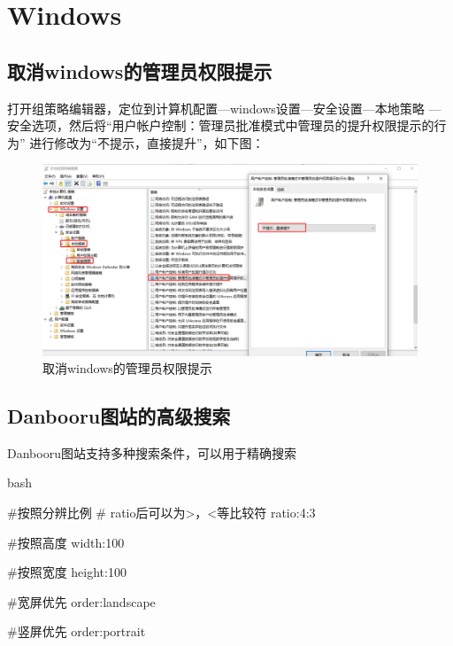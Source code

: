 \chapter{Windows}

\section{取消windows的管理员权限提示}

打开组策略编辑器，定位到计算机配置—windows设置—安全设置—本地策略
—安全选项，然后将“用户帐户控制：管理员批准模式中管理员的提升权限提示的行为”
进行修改为“不提示，直接提升”，如下图：
\begin{figure}[H]
  \centering
  \includegraphics[width=\linewidth]{windows_admin.png}
  \caption{取消windows的管理员权限提示}
  \label{fig:windows_admin}
\end{figure}

\section{Danbooru图站的高级搜索}
Danbooru图站支持多种搜索条件，可以用于精确搜索

\begin{code-block}{bash}

#按照分辨比例
# ratio后可以为>，<等比较符
ratio:4:3

#按照高度
width:100

#按照宽度
height:100

#宽屏优先
order:landscape

#竖屏优先
order:portrait
\end{code-block}

